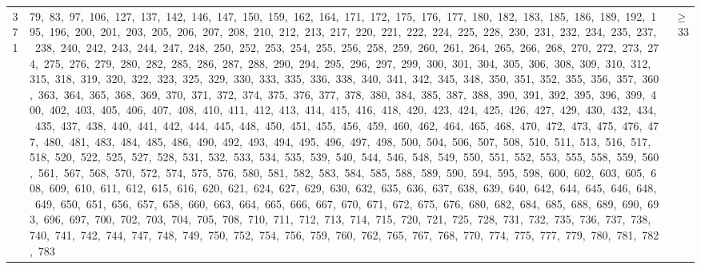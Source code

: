 \begin{longtable}{c|p{}|r}
371 & 79,\ 83,\ 97,\ 106,\ 127,\ 137,\ 142,\ 146,\ 147,\ 150,\ 159,\ 162,\ 164,\ 171,\ 172,\ 175,\ 176,\ 177,\ 180,\ 182,\ 183,\ 185,\ 186,\ 189,\ 192,\ 195,\ 196,\ 200,\ 201,\ 203,\ 205,\ 206,\ 207,\ 208,\ 210,\ 212,\ 213,\ 217,\ 220,\ 221,\ 222,\ 224,\ 225,\ 228,\ 230,\ 231,\ 232,\ 234,\ 235,\ 237,\ 238,\ 240,\ 242,\ 243,\ 244,\ 247,\ 248,\ 250,\ 252,\ 253,\ 254,\ 255,\ 256,\ 258,\ 259,\ 260,\ 261,\ 264,\ 265,\ 266,\ 268,\ 270,\ 272,\ 273,\ 274,\ 275,\ 276,\ 279,\ 280,\ 282,\ 285,\ 286,\ 287,\ 288,\ 290,\ 294,\ 295,\ 296,\ 297,\ 299,\ 300,\ 301,\ 304,\ 305,\ 306,\ 308,\ 309,\ 310,\ 312,\ 315,\ 318,\ 319,\ 320,\ 322,\ 323,\ 325,\ 329,\ 330,\ 333,\ 335,\ 336,\ 338,\ 340,\ 341,\ 342,\ 345,\ 348,\ 350,\ 351,\ 352,\ 355,\ 356,\ 357,\ 360,\ 363,\ 364,\ 365,\ 368,\ 369,\ 370,\ 371,\ 372,\ 374,\ 375,\ 376,\ 377,\ 378,\ 380,\ 384,\ 385,\ 387,\ 388,\ 390,\ 391,\ 392,\ 395,\ 396,\ 399,\ 400,\ 402,\ 403,\ 405,\ 406,\ 407,\ 408,\ 410,\ 411,\ 412,\ 413,\ 414,\ 415,\ 416,\ 418,\ 420,\ 423,\ 424,\ 425,\ 426,\ 427,\ 429,\ 430,\ 432,\ 434,\ 435,\ 437,\ 438,\ 440,\ 441,\ 442,\ 444,\ 445,\ 448,\ 450,\ 451,\ 455,\ 456,\ 459,\ 460,\ 462,\ 464,\ 465,\ 468,\ 470,\ 472,\ 473,\ 475,\ 476,\ 477,\ 480,\ 481,\ 483,\ 484,\ 485,\ 486,\ 490,\ 492,\ 493,\ 494,\ 495,\ 496,\ 497,\ 498,\ 500,\ 504,\ 506,\ 507,\ 508,\ 510,\ 511,\ 513,\ 516,\ 517,\ 518,\ 520,\ 522,\ 525,\ 527,\ 528,\ 531,\ 532,\ 533,\ 534,\ 535,\ 539,\ 540,\ 544,\ 546,\ 548,\ 549,\ 550,\ 551,\ 552,\ 553,\ 555,\ 558,\ 559,\ 560,\ 561,\ 567,\ 568,\ 570,\ 572,\ 574,\ 575,\ 576,\ 580,\ 581,\ 582,\ 583,\ 584,\ 585,\ 588,\ 589,\ 590,\ 594,\ 595,\ 598,\ 600,\ 602,\ 603,\ 605,\ 608,\ 609,\ 610,\ 611,\ 612,\ 615,\ 616,\ 620,\ 621,\ 624,\ 627,\ 629,\ 630,\ 632,\ 635,\ 636,\ 637,\ 638,\ 639,\ 640,\ 642,\ 644,\ 645,\ 646,\ 648,\ 649,\ 650,\ 651,\ 656,\ 657,\ 658,\ 660,\ 663,\ 664,\ 665,\ 666,\ 667,\ 670,\ 671,\ 672,\ 675,\ 676,\ 680,\ 682,\ 684,\ 685,\ 688,\ 689,\ 690,\ 693,\ 696,\ 697,\ 700,\ 702,\ 703,\ 704,\ 705,\ 708,\ 710,\ 711,\ 712,\ 713,\ 714,\ 715,\ 720,\ 721,\ 725,\ 728,\ 731,\ 732,\ 735,\ 736,\ 737,\ 738,\ 740,\ 741,\ 742,\ 744,\ 747,\ 748,\ 749,\ 750,\ 752,\ 754,\ 756,\ 759,\ 760,\ 762,\ 765,\ 767,\ 768,\ 770,\ 774,\ 775,\ 777,\ 779,\ 780,\ 781,\ 782,\ 783 & $\ge$ 33 \\

\end{longtable}
